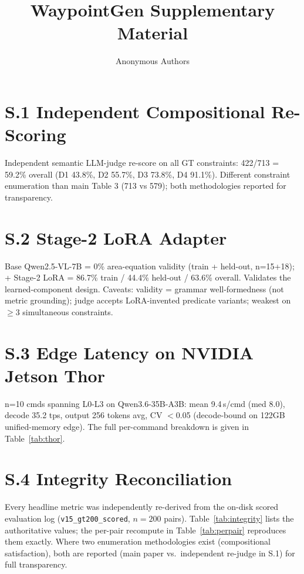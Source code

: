 \documentclass{article}
\title{WaypointGen Supplementary Material}\author{Anonymous Authors}\date{}
\begin{document}
\maketitle

\section*{S.1 Independent Compositional Re-Scoring}
Independent semantic LLM-judge re-score on all GT constraints: 422/713 = 59.2\%
overall (D1 43.8\%, D2 55.7\%, D3 73.8\%, D4 91.1\%). Different constraint enumeration
than main Table 3 (713 vs 579); both methodologies reported for transparency.

\section*{S.2 Stage-2 LoRA Adapter}
Base Qwen2.5-VL-7B = 0\% area-equation validity (train + held-out, n=15+18);
+ Stage-2 LoRA = 86.7\% train / 44.4\% held-out / 63.6\% overall. Validates the
learned-component design. Caveats: validity = grammar well-formedness (not metric
grounding); judge accepts LoRA-invented predicate variants; weakest on $\geq$3 simultaneous constraints.

\section*{S.3 Edge Latency on NVIDIA Jetson Thor}
n=10 cmds spanning L0-L3 on Qwen3.6-35B-A3B: mean 9.4\,s/cmd (med 8.0), decode 35.2 tps,
output 256 tokens avg, CV $<$0.05 (decode-bound on 122GB unified-memory edge).
The full per-command breakdown is given in Table~\ref{tab:thor}.



\section*{S.4 Integrity Reconciliation}
Every headline metric was independently re-derived from the on-disk scored evaluation
log (\texttt{v15\_gt200\_scored}, $n=200$ pairs). Table~\ref{tab:integrity} lists the
authoritative values; the per-pair recompute in Table~\ref{tab:perpair} reproduces them
exactly. Where two enumeration methodologies exist (compositional satisfaction), both are
reported (main paper vs.\ independent re-judge in S.1) for full transparency.


\end{document}
